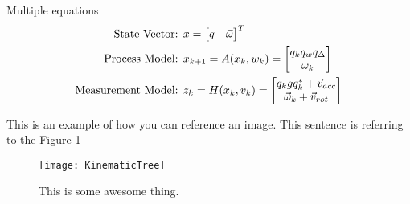 Multiple equations
\begin{align}
\textnormal{State Vector: }& x = \begin{bmatrix}q&\vec{\omega}\end{bmatrix}^T \\
\textnormal{Process Model: }& x_{k+1} = A(x_k, w_k) = \begin{bmatrix}q_kq_wq_{\Delta}\\\omega_{k}\end{bmatrix}\\
\textnormal{Measurement Model: }& z_k = H(x_k, v_k) = \begin{bmatrix}q_kgq_k^* + \vec{v}_{acc}\\\vec{\omega}_k + \vec{v}_{rot}\end{bmatrix}
\end{align}

This is an example of how you can reference an image. This sentence is referring to the Figure \ref{fig:tree}

\begin{figure}
    \centering
    \texttt{[image: KinematicTree]}
    \caption{This is some awesome thing.}
    \label{fig:tree}
\end{figure}
